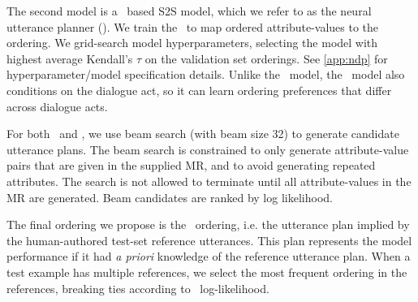 The second model is a \biGRU~based S2S model, which we refer to as the neural
utterance planner (\NUP). We train the \NUP~to map  ordered
attribute-values to the  ordering. We grid-search model
hyperparameters, selecting the model with highest average Kendall's $\tau$
\cite{kendall1938} on the validation set  orderings. See
\autoref{app:ndp} for hyperparameter/model specification details. Unlike the
\BgUP~model, the \NUP~model also conditions on the dialogue act, so it can
learn ordering preferences that differ across dialogue acts.

For both \BgUP~and \NUP, we use beam search (with beam size 32) to generate
candidate utterance plans. The beam search is constrained to only generate
attribute-value pairs that are given in the supplied MR, and to avoid
generating repeated attributes. The search is not allowed to terminate until
all attribute-values in the MR are generated.  Beam candidates are ranked by
log likelihood.

The final ordering we propose is the \Oracle~ordering, i.e. the utterance plan
implied by the human-authored test-set reference utterances. This plan
represents the model performance if it had \textit{a priori}  knowledge of the
reference utterance plan. When a test example has multiple references, we
select the most frequent ordering in the references, breaking ties according
to \BgUP~log-likelihood.
